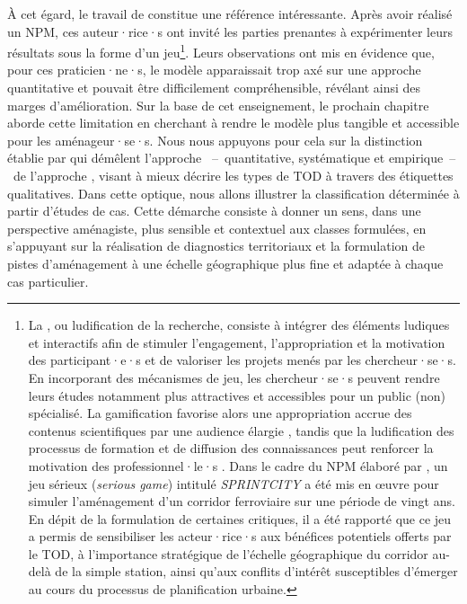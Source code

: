 \begin{refsegment}
À cet égard, le travail de \textcolor{blue}{\textcite[784]{duffhues_breaking_2014}} constitue une référence intéressante. Après avoir réalisé un \acrshort{NPM}, ces auteur·rice·s ont invité les parties prenantes à expérimenter leurs résultats sous la forme d’un jeu\footnote{
    La , ou ludification de la recherche, consiste à intégrer des éléments ludiques et interactifs afin de stimuler l'engagement, l'appropriation et la motivation des participant·e·s et de valoriser les projets menés par les chercheur·se·s. En incorporant des mécanismes de jeu, les chercheur·se·s peuvent rendre leurs études notamment plus attractives et accessibles pour un public (non) spécialisé. La gamification favorise alors une appropriation accrue des contenus scientifiques par une audience élargie \textcolor{blue}{\autocite[6]{genvo_approche_2014}}, tandis que la ludification des processus de formation et de diffusion des connaissances peut renforcer la motivation des professionnel·le·s \textcolor{blue}{\autocite[36, 62]{lu_gamification_2023}}. Dans le cadre du \acrshort{NPM} élaboré par \textcolor{blue}{\textcite[784]{duffhues_breaking_2014}}, un jeu sérieux (\textsl{serious game}) intitulé \textsl{SPRINTCITY} a été mis en œuvre pour simuler l'aménagement d'un corridor ferroviaire sur une période de vingt ans. En dépit de la formulation de certaines critiques, il a été rapporté que ce jeu a permis de sensibiliser les acteur·rice·s aux bénéfices potentiels offerts par le \acrshort{TOD}, à l'importance stratégique de l'échelle géographique du corridor au-delà de la simple station, ainsi qu'aux conflits d'intérêt susceptibles d'émerger au cours du processus de planification urbaine.
}. Leurs observations ont mis en évidence que, pour ces praticien·ne·s, le modèle apparaissait trop axé sur une approche quantitative et pouvait être difficilement compréhensible, révélant ainsi des marges d’amélioration. Sur la base de cet enseignement, le prochain chapitre aborde cette limitation en cherchant à rendre le modèle plus tangible et accessible pour les aménageur·se·s. Nous nous appuyons pour cela sur la distinction établie par \textcolor{blue}{\textcite[499]{higgins_forty_2016}} qui démêlent l’approche ~–~quantitative, systématique et empirique~–~de l’approche , visant à mieux décrire les types de \acrshort{TOD} à travers des étiquettes qualitatives. Dans cette optique, nous allons illustrer la classification déterminée à partir d’études de cas. Cette démarche consiste à donner un sens, dans une perspective aménagiste, plus sensible et contextuel aux classes formulées, en s’appuyant sur la réalisation de diagnostics territoriaux et la formulation de pistes d’aménagement à une échelle géographique plus fine et adaptée à chaque cas particulier.%


\end{refsegment}
